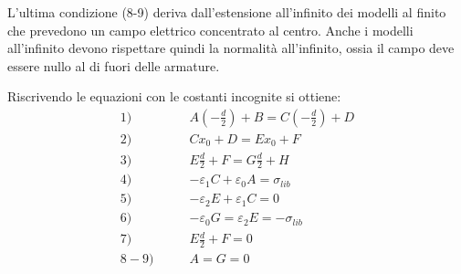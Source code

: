 L'ultima condizione (8-9) deriva dall'estensione all'infinito dei modelli al 
finito che prevedono un campo elettrico concentrato al centro. Anche i modelli
all'infinito devono rispettare quindi la normalità all'infinito, ossia il
campo deve essere nullo al di fuori delle armature.

Riscrivendo le equazioni con le costanti incognite si ottiene:
\begin{align*}
1)   \qquad & A\left(-\frac{d}{2}\right) + B = C\left(-\frac{d}{2}\right) + D \\
2)   \qquad & Cx_0 + D = Ex_0 + F \\
3)   \qquad &E\frac{d}{2} + F = G \frac{d}{2} + H \\
4)   \qquad &- \varepsilon_1 C + \varepsilon_0 A = \sigma_{lib} \\
5)   \qquad &- \varepsilon_2 E + \varepsilon_1 C = 0 \\
6)   \qquad &-\varepsilon_0G = \varepsilon_2 E = -\sigma_{lib} \\
7)   \qquad & E\frac{d}{2} + F = 0 \\
8-9) \qquad & A = G = 0
\end{align*}

